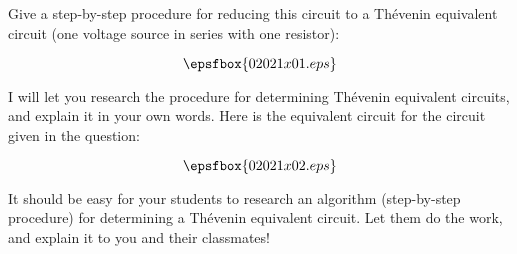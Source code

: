 

Give a step-by-step procedure for reducing this circuit to a Th\'evenin equivalent circuit (one voltage source in series with one resistor):

$$\epsfbox{02021x01.eps}$$







I will let you research the procedure for determining Th\'evenin equivalent circuits, and explain it in your own words.  Here is the equivalent circuit for the circuit given in the question:

$$\epsfbox{02021x02.eps}$$







It should be easy for your students to research an algorithm (step-by-step procedure) for determining a Th\'evenin equivalent circuit.  Let them do the work, and explain it to you and their classmates!




